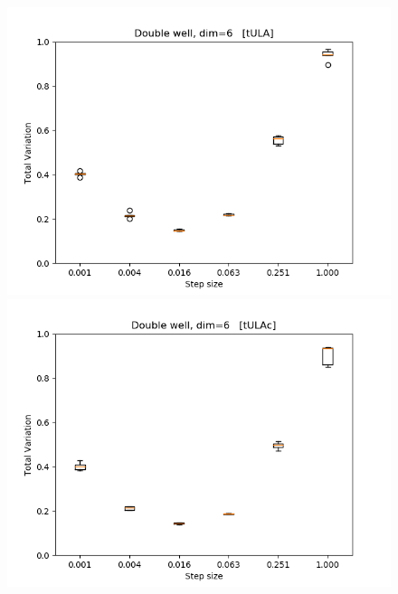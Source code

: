 \begin{figure}[H]
\centering
  \begin{minipage}[b]{0.32\textwidth}
  \centering
    \includegraphics[width=\textwidth]{Figures/tula_tv.png}
  \end{minipage} %
  \begin{minipage}[b]{0.32\textwidth}
  \centering
    \includegraphics[width=\textwidth]{Figures/tulac_tv.png}
  \end{minipage} %
  \begin{minipage}[b]{0.32\textwidth}
  \centering

\end{minipage}
\end{figure}
